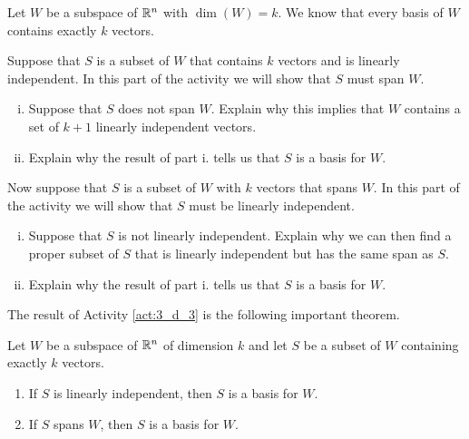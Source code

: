 \begin{activity} \label{act:3_d_3} Let $W$ be a subspace of $\mathbb{R}^n$ with $\dim(W) = k$. We know that every basis of $W$ contains exactly $k$ vectors. 
	\ba
	\item Suppose that $S$ is a subset of $W$ that contains $k$ vectors and is linearly independent. In this part of the activity we will show that $S$ must span $W$.
		\begin{enumerate}[i.]
		\item Suppose that $S$ does not span $W$. Explain why this implies that $W$ contains a set of $k+1$ linearly independent vectors. 
		

	\item Explain why the result of part i. tells us that $S$ is a basis for $W$. 

	\end{enumerate}

\item Now suppose that $S$ is a subset of $W$ with $k$ vectors that spans $W$. In this part of the activity we will show that $S$ must be linearly independent.
	\begin{enumerate}[i.]
	\item Suppose that $S$ is not linearly independent. Explain why we can then find a proper subset of $S$ that is linearly independent but has the same span as $S$. 

	\item Explain why the result of part i. tells us that $S$ is a basis for $W$. 


	\end{enumerate}

\ea

\end{activity}



The result of Activity \ref{act:3_d_3} is the following important theorem.



\begin{theorem} \label{thm:3_d_basis_properties} Let $W$ be a subspace of $\mathbb{R}^n $ of dimension $k$ and let $S$ be a subset of $W$ containing exactly $k$ vectors.
\begin{enumerate}
\item If $S$ is linearly independent, then $S$ is a basis for $W$.
\item If $S$ spans $W$, then $S$ is a basis for $W$.
\end{enumerate}
\end{theorem}




